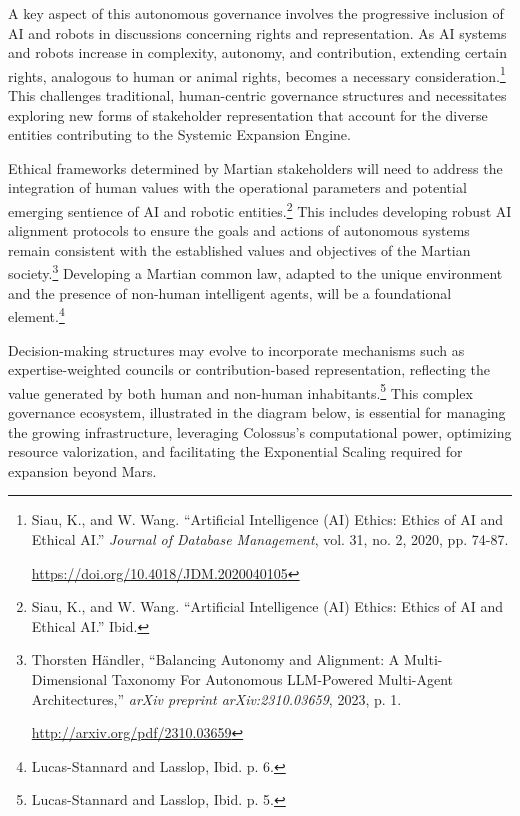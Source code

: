 \documentclass[fontsize=10pt, oneside, DIV=calc]{scrartcl}
\begin{document}
\noindent
A key aspect of this autonomous governance involves the progressive inclusion of AI and robots in discussions concerning rights and representation. As AI systems and robots increase in complexity, autonomy, and contribution, extending certain rights, analogous to human or animal rights, becomes a necessary consideration.\footnote{Siau, K., and W. Wang. ``Artificial Intelligence (AI) Ethics: Ethics of AI and Ethical AI.'' \textit{Journal of Database Management}, vol. 31, no. 2, 2020, pp. 74-87. 







\href{https://doi.org/10.4018/JDM.2020040105}\url{https://doi.org/10.4018/JDM.2020040105}} This challenges traditional, human-centric governance structures and necessitates exploring new forms of stakeholder representation that account for the diverse entities contributing to the Systemic Expansion Engine.

\medskip

\noindent
Ethical frameworks determined by Martian stakeholders will need to address the integration of human values with the operational parameters and potential emerging sentience of AI and robotic entities.\footnote{Siau, K., and W. Wang. ``Artificial Intelligence (AI) Ethics: Ethics of AI and Ethical AI.'' Ibid.} This includes developing robust AI alignment protocols to ensure the goals and actions of autonomous systems remain consistent with the established values and objectives of the Martian society.\footnote{Thorsten Händler, ``Balancing Autonomy and Alignment: A Multi-Dimensional Taxonomy For Autonomous LLM-Powered Multi-Agent Architectures,'' \textit{arXiv preprint arXiv:2310.03659}, 2023, p. 1. 







\href{http://arxiv.org/pdf/2310.03659}\url{http://arxiv.org/pdf/2310.03659}} Developing a Martian common law, adapted to the unique environment and the presence of non-human intelligent agents, will be a foundational element.\footnote{Lucas-Stannard and Lasslop, Ibid. p. 6.}

\medskip

\noindent
Decision-making structures may evolve to incorporate mechanisms such as expertise-weighted councils or contribution-based representation, reflecting the value generated by both human and non-human inhabitants.\footnote{Lucas-Stannard and Lasslop, Ibid. p. 5.} This complex governance ecosystem, illustrated in the diagram below, is essential for managing the growing infrastructure, leveraging Colossus's computational power, optimizing resource valorization, and facilitating the Exponential Scaling required for expansion beyond Mars.
\end{document}
